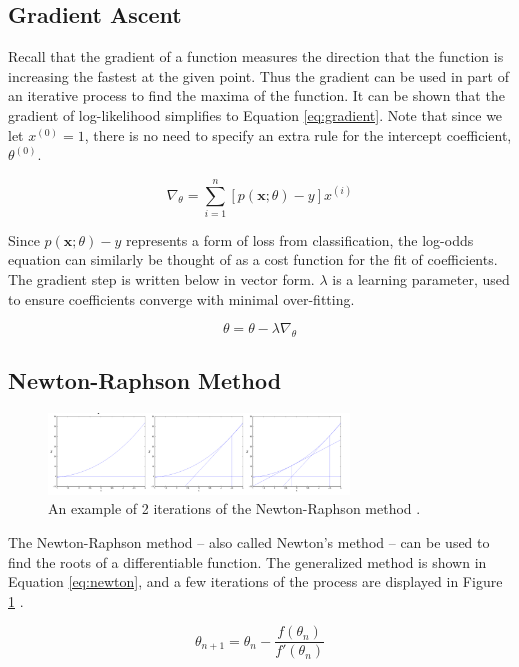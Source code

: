 \documentclass[letterpaper]{article} %
\begin{document}
\subsection{Gradient Ascent}
Recall that the gradient of a function measures the direction that the function is increasing the
fastest at the given point. Thus the gradient can be used in part of an iterative process to find
the maxima of the function.
It can be shown that the gradient of log-likelihood simplifies to Equation \ref{eq:gradient}.
Note that since we let $x^{(0)} = 1$, there is no need to specify an extra rule for the intercept coefficient,
$\theta^{(0)}$.

\begin{equation}
\label{eq:gradient}
\nabla_{\theta} = 
\sum_{i=1}^{n}[p(\mathbf{x};\theta) - y]x^{(i)}
\end{equation}

Since $p(\mathbf{x};\theta) - y$ represents a form of loss from classification,
the log-odds equation can similarly be thought of as a cost function for the fit of coefficients.
The gradient step is written below in vector form.
$\lambda$ is a learning parameter, used to ensure coefficients converge with minimal over-fitting.

$$\theta = \theta - \lambda\nabla_{\theta}$$

\subsection{Newton-Raphson Method}
\begin{figure}[htbp]
\centerline{\includegraphics[width=8cm]{newton.png}}
\caption{An example of 2 iterations of the Newton-Raphson method
\cite{notes}.}
\label{fig:newton}
\end{figure}

The Newton-Raphson method -- also called Newton's method --
can be used to find the roots of a differentiable function.
The generalized method is shown in Equation \ref{eq:newton},
and a few iterations of the process are displayed in Figure \ref{fig:newton} \cite{notes}.

\begin{equation}
\label{eq:newton}
\theta_{n + 1} = \theta_n - \frac{f(\theta_n)}{f'(\theta_n)}
\end{equation}
\end{document}
